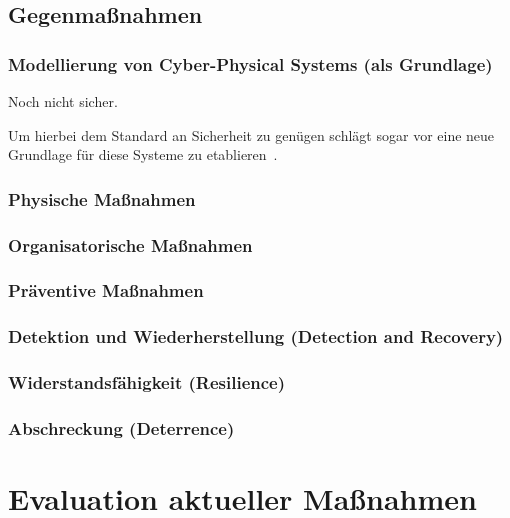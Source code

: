\documentclass[final,bibliography=totocnumbered]{include/sikseminar}
\begin{document}
\subsection{Gegenmaßnahmen}\label{subsec:gegenmassnahmen}




\subsubsection{Modellierung von Cyber-Physical Systems (als Grundlage)}
Noch nicht sicher.

Um hierbei dem Standard an Sicherheit zu genügen schlägt \citeauthor{Lee08} sogar vor eine neue Grundlage für diese Systeme zu etablieren~\cite{Lee08}.

\subsubsection{Physische Maßnahmen}

\subsubsection{Organisatorische Maßnahmen}

\subsubsection{Präventive Maßnahmen}

\subsubsection{Detektion und Wiederherstellung (Detection and Recovery)}

\subsubsection{Widerstandsfähigkeit (Resilience)} %


\subsubsection{Abschreckung (Deterrence)} %

\section{Evaluation aktueller Maßnahmen}\label{sec:evaluation}

\newpage
\nocite{*}
\printbibliography
\newpage
\end{document}
